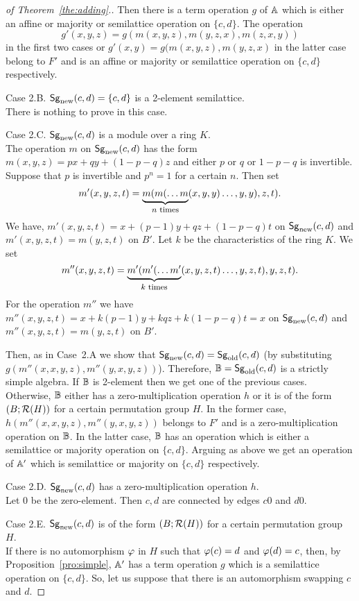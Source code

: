 \documentclass[11pt]{article}
\begin{document}
\begin{proof}[of Theorem~\ref{the:adding}.]
Then there is a term operation $g$ of ${\mathbb A}$ which is either an affine 
or majority or semilattice operation on $\{c,d\}$. The operation
$$
g'(x,y,z)=g(m(x,y,z),m(y,z,x),m(z,x,y))
$$ 
in the first two cases or
$g'(x,y)=g(m(x,y,z),m(y,z,x)$ in the latter case belong to $F'$ and is an
affine or majority or semilattice operation on $\{c,d\}$ respectively.
\medskip

\noindent
{\sc Case 2.B.} ${\sf Sg}_{\mathrm{new}}(c,d)=\{c,d\}$ is a 2-element
semilattice.\\[2mm] 
There is nothing to prove in this case.
\medskip

\noindent
{\sc Case 2.C.} ${\sf Sg}_{\mathrm{new}}(c,d)$ is a module over a ring $K$.\\[2mm] 
The operation $m$ on ${\sf Sg}_{\mathrm{new}}(c,d)$ has the form
$m(x,y,z)=px+qy+(1-p-q)z$ and either $p$ or $q$ or $1-p-q$ is
invertible. Suppose that $p$ is invertible and $p^n=1$ for a certain
$n$. Then set 
$$
m'(x,y,z,t)=\underbrace{m(m(\ldots m}_{\mbox{\footnotesize $n$
times}}(x,y,y)\ldots,y,y),z,t).
$$
We have, $m'(x,y,z,t)=x+(p-1)y+qz+(1-p-q)t$ on ${\sf Sg}_{\mathrm{new}}(c,d)$ and
$m'(x,y,z,t)=m(y,z,t)$ on $B'$. Let $k$ be the
characteristics of the ring $K$. We set
$$
m''(x,y,z,t)=\underbrace{m'(m'(\ldots m'}_{\mbox{\footnotesize $k$
times}}(x,y,z,t)\ldots,y,z,t),y,z,t).
$$
For the operation $m''$ we have
$m''(x,y,z,t)=x+k(p-1)y+kqz+k(1-p-q)t=x$ on ${\sf Sg}_{\mathrm{new}}(c,d)$ and 
$m''(x,y,z,t)=m(y,z,t)$ on $B'$.

Then, as in Case~2.A we show that
${\sf Sg}_{\mathrm{new}}(c,d)={\sf Sg}_{\mathrm{old}}(c,d)$ (by substituting
$g(m''(x,x,y,z),m''(y,x,y,z))$). Therefore, ${\mathbb B}={\sf Sg}_{\mathrm{old}}(c,d)$ is a 
strictly simple algebra. If ${\mathbb B}$ is 2-element then we get one of the
previous cases. Otherwise, ${\mathbb B}$ either has a zero-multiplication
operation $h$ or it is of the form $(B;{\mathcal R}(H))$ for a certain
permutation group $H$. In the former case,
$h(m''(x,x,y,z),m''(y,x,y,z))$ belongs 
to $F'$ and is a zero-multiplication operation on ${\mathbb B}$. In the latter 
case, ${\mathbb B}$ has an operation which is either a semilattice or majority 
operation on $\{c,d\}$. Arguing as above we get an operation of
${\mathbb A}'$ which is semilattice or majority on $\{c,d\}$ respectively.
\medskip

\noindent
{\sc Case 2.D.} ${\sf Sg}_{\mathrm{new}}(c,d)$ has a zero-multiplication
operation $h$.\\[2mm] 
Let $0$ be the zero-element. Then $c,d$ are connected by edges $c0$
and $d0$.
\medskip

\noindent
{\sc Case 2.E.} ${\sf Sg}_{\mathrm{new}}(c,d)$ is of the form $(B;{\mathcal R}(H))$ for a
certain permutation group~$H$.\\[2mm] 
If there is no automorphism $\varphi$ in $H$ such that $\varphi(c)=d$ and
$\varphi(d)=c$, then, by Proposition~\ref{pro:simple}, ${\mathbb A}'$ has a term
operation $g$ which is a semilattice operation on $\{c,d\}$. So, let
us suppose that there is an automorphism swapping $c$ and $d$. 


\end{proof}
\end{document}
